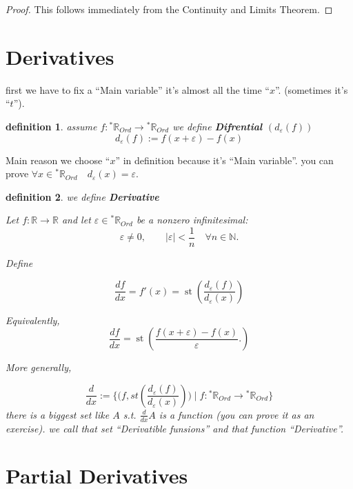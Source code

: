 \documentclass[10pt,a4paper]{book}
\newtheorem{definition}{definition}[section]
\begin{document}
\begin{proof}

    This follows immediately from the Continuity and Limits Theorem.

\end{proof}

\section{Derivatives}

first we have to fix a ``Main variable'' it's almost all the time ``$x$''.
(sometimes it's ``$t$'').
\begin{definition} assume $f : {}^*\mathbb{R}_{Ord} \to {}^*\mathbb{R}_{Ord}$
    we define \textbf{Difrential $(d_\varepsilon(f))$}
    \[ d_\varepsilon(f) := f( x + \varepsilon ) -  f(x) \]
\end{definition}

Main reason we choose ``$x$'' in definition because it's ``Main variable''. you
can prove $\forall x \in {}^*\mathbb{R}_{Ord} \quad d_\varepsilon(x) =
    \varepsilon$.

\begin{definition} we define \textbf{Derivative}

    Let $ f:\mathbb{R}\to\mathbb{R}$ and let \( \varepsilon
    \in{}^*\mathbb{R}_{Ord}\) be a nonzero infinitesimal:
    \[
        \varepsilon \neq 0,
        \qquad
        | \varepsilon |<\frac{1}{n}
        \quad\forall n\in\mathbb{N}.
    \]

    Define

    \[
        \frac{df}{dx} = f'(x) =
        \operatorname{st}
        \left(
        \frac{d_\varepsilon(f)}{d_\varepsilon(x)}
        \right)
    \]

    Equivalently,
    \[
        \frac{df}{dx}
        =
        \operatorname{st}
        \left(
        \frac{f(x + \varepsilon )-f(x)}{ \varepsilon }.
        \right)
    \]

    More generally,

    \[ \frac{d}{dx}  :=  \{ \big(f , st(\frac{d_\varepsilon(f)}{d_\varepsilon(x)}) \big) \mid f : {}^*\mathbb{R}_{Ord} \to {}^*\mathbb{R}_{Ord} \} \]
    there is a biggest set like $A$ s.t. $ \frac{d}{dx} A$ is a function (you can
    prove it as an exercise). we call that set ``Derivatible funsions'' and that
    function ``Derivative''.
\end{definition}

\section{Partial Derivatives}
\end{document}
